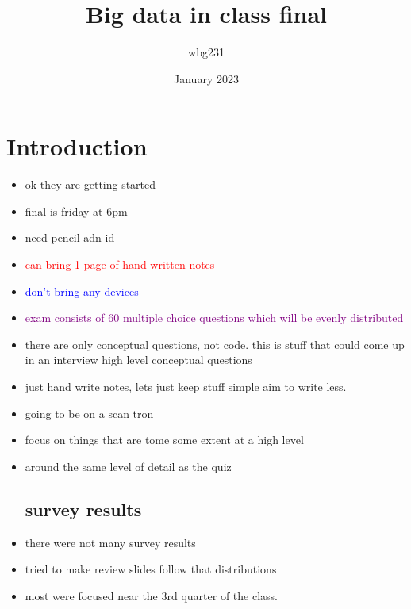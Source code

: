 \documentclass{article}
\title{Big data in class final }
\author{wbg231 }
\date{January 2023}
\begin{document}
\maketitle

\section*{Introduction}
\begin{itemize}
    \item ok they are getting started 
    \item final is friday at 6pm 
    \item need pencil adn id 
    \item \textcolor{red}{can bring 1 page of hand written notes}
    \item \textcolor{blue}{don't bring any devices}
    \item \textcolor{purple}{exam consists of 60 multiple choice questions which will be evenly distributed}
    \item there are only conceptual questions, not code. this is stuff that could come up in an interview high level conceptual questions 
    \item just hand write notes, lets just keep stuff simple aim to write less. 
    \item going to be on a scan tron 
    \item focus on things that are tome some extent at a high level 
    \item around the same level of detail as the quiz 
\subsection*{survey results}
    \item there were not many survey results 
    \item tried to make review slides follow that distributions
    \item most were focused near the 3rd quarter of the class. 

\end{itemize}
\end{document}
